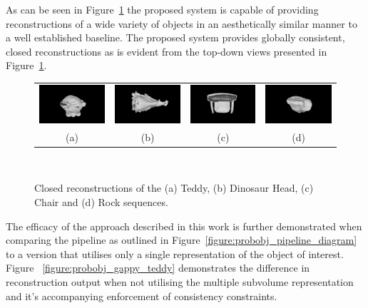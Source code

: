 As can be seen in Figure~\ref{figure:probobj_comp_itm} the proposed system is 
capable of providing reconstructions of a wide variety of objects in an 
aesthetically similar manner to a well established baseline. The proposed 
system provides globally consistent, closed reconstructions as is evident from 
the top-down views presented in Figure~\ref{figure:probobj_comp_itm}.

\begin{figure}[!htbp]
	\centering
	\begin{tabular}{cccc}
		\includegraphics[width=.2\linewidth]{figures/object_recon/top/teddy_top00.png}&
    \includegraphics[width=.2\linewidth]{figures/object_recon/top/dino_top00.png} &
		\includegraphics[width=.2\linewidth]{figures/object_recon/top/chair_top00.png}&
    \includegraphics[width=.2\linewidth]{figures/object_recon/top/rock_top00.png} \\
    (a) & (b) & (c) & (d) \\
	\end{tabular}
  \caption[Probabilistic Object Reconstruction Qualitative Results IV]
  {
    Closed reconstructions of the (a) Teddy, (b) Dinosaur Head, 
    (c) Chair and (d) Rock sequences.
  }
~\label{figure:probobj_comp_itm}
\end{figure}

The efficacy of the approach described in this work is further demonstrated when comparing
the pipeline as outlined in Figure~\ref{figure:probobj_pipeline_diagram} to a version that 
utilises only a single representation of the object of interest. Figure 
~\ref{figure:probobj_gappy_teddy} demonstrates the difference in reconstruction output when 
not utilising the multiple subvolume representation and it's accompanying enforcement 
of consistency constraints. 


